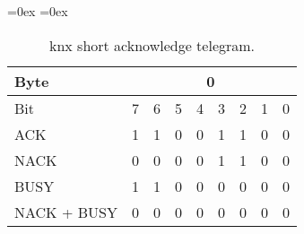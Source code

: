 \begin{table}[p]
	\aboverulesep=0ex
	\belowrulesep=0ex
	\renewcommand{\arraystretch}{1.2}
	
	\centering
	\begin{tabularx}{0.7\textwidth}{|l|Y|Y|Y|Y|Y|Y|Y|Y|}
		\toprule
		Byte &  \\\midrule
		Bit & 7 & 6 & 5 & 4 & 3 & 2 & 1 & 0 \\\bottomrule
		\toprule
		ACK  & 1 & 1 & 0 & 0 & 1 & 1 & 0 & 0 \\\midrule
		NACK & 0 & 0 & 0 & 0 & 1 & 1 & 0 & 0 \\\midrule
		BUSY & 1 & 1 & 0 & 0 & 0 & 0 & 0 & 0 \\\midrule
		NACK + BUSY & 0 & 0 & 0 & 0 & 0 & 0 & 0 & 0 \\\bottomrule
	\end{tabularx}
	\caption[KNX acknowledge telegram]{\gls{knx} short acknowledge telegram.}
	\label{tab:background:bas:knx:proto:ack}
\end{table}